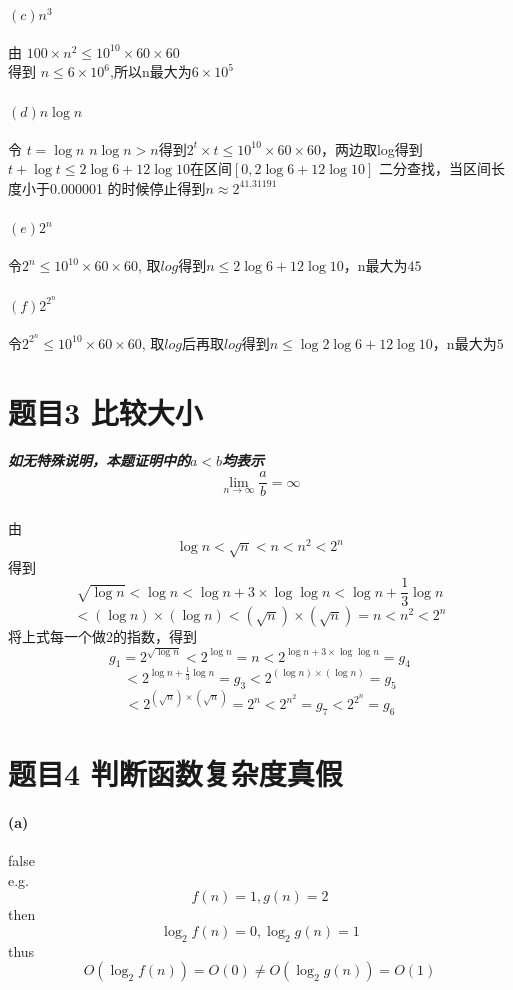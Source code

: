 \documentclass[a4paper,10pt]{article}
\begin{document}
  \paragraph{$(c) n^3 $}
  由 $100\times n^2\leqslant10^{10}\times60\times60$ \\ 得到 $n\leqslant6\times10^6$,所以n最大为$6\times10^5$
  \paragraph{$(d) n\log n$}
  令 $t=\log n$ $n\log n>n$得到$2^t\times t\leqslant10^{10}\times60\times60$，两边取log得到$t+\log t \leqslant 2\log6+12\log10$在区间$[0, 2\log6+12\log10]$ 二分查找，当区间长度小于0.000001 的时候停止得到$n\approx 2^{41.31191}$



  \paragraph{$(e) 2^n$}
  令$2^n \leqslant 10^{10} \times 60 \times 60$, 取$log$得到$n\leqslant 2\log6+12\log10$，n最大为$45$
  \paragraph{$(f) 2^{2^n}$}
  令$2^{2^n} \leqslant 10^{10} \times 60 \times 60$, 取$log$后再取$log$得到$n\leqslant \log{2\log6+12\log10}$，n最大为$5$

\section{题目3 比较大小}
  \subparagraph{如无特殊说明，本题证明中的$a<b$均表示 $$\lim_{n \to \infty}\frac{a}{b} = \infty$$}
  \paragraph{}
  由$$\log n<\sqrt n<n<n^2<2^n$$ 得到
  $$\sqrt{\log n}<\log n<\log n+3\times \log{\log n}<\log n+\frac{1}{3}\log n$$
  $$<(\log n)\times(\log n)<(\sqrt n)\times(\sqrt n)=n<n^2<2^n$$
  将上式每一个做2的指数，得到
  $$g_1=2^{\sqrt{\log n}}<2^{\log n}=n<2^{\log n+3\times \log{\log n}}=g_4$$
  $$<2^{\log n+\frac{1}{3}\log n}=g_3<2^{(\log n)\times(\log n)}=g_5$$
  $$<2^{(\sqrt n)\times(\sqrt n)}=2^n<2^{n^2}=g_7<2^{2^n}=g_6$$
\section{题目4 判断函数复杂度真假}
  \paragraph{(a)}
  false\\
  e.g.
  $$f(n)=1, g(n)=2$$
  then
  $$\log_2 f(n)=0, \log_2 g(n)=1$$
  thus
  $$O(\log_2 f(n))=O(0)\neq O(\log_2 g(n))=O(1)$$
\end{document}

